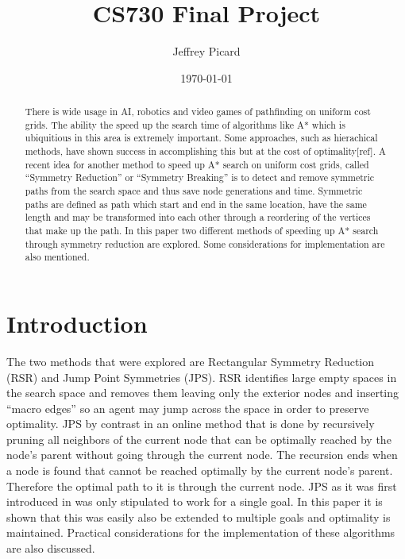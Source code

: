 \documentclass[12pt]{article}
\date{\small\today} \title{CS730 Final Project} \author{Jeffrey Picard}
\begin{document}
\maketitle


\begin{abstract}
There is wide usage in AI, robotics and video games of pathfinding on uniform cost grids. The ability the speed up the search time of algorithms like A*
which is ubiquitious in this area is extremely important. Some approaches, such as hierachical methods, have shown success in accomplishing this but at
the cost of optimality[ref]. A recent idea for another method to speed up A* search on uniform cost grids, called ``Symmetry Reduction'' or ``Symmetry Breaking'' 
is to detect and remove symmetric paths from the search space and thus save node generations and time. Symmetric paths are defined as path which start and end
in the same location, have the same length and may be transformed into each other through a reordering of the vertices that make up the path.
In this paper two different methods of speeding up A* search through symmetry reduction are explored. Some considerations for implementation are also mentioned.
\end{abstract}


\section{Introduction}
The two methods that were explored are Rectangular Symmetry Reduction (RSR) and Jump Point Symmetries (JPS). RSR identifies large empty spaces
in the search space and removes them leaving only the exterior nodes and inserting ``macro edges'' so an agent may jump across the space in order to preserve
optimality. JPS by contrast in an online method that is done by recursively pruning all neighbors of the current node that can be optimally reached by the 
node's parent without going through the current node. The recursion ends when a node is found that cannot be reached optimally by the current node's parent. 
Therefore the optimal path to it is through the current node. JPS as it was first introduced in\cite{Har2011} was only stipulated to work for a single goal.
In this paper it is shown that this was easily also be extended to multiple goals and optimality is maintained. Practical considerations for the implementation
of these algorithms are also discussed.
	
\end{document}
